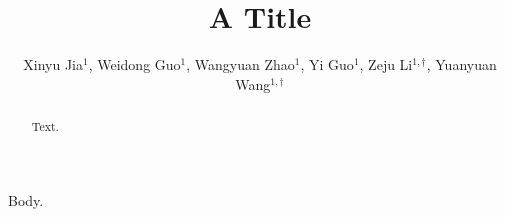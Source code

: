\documentclass{llncs}
\begin{document}
\title{A Title}
\author{Xinyu Jia$^{1}$, Weidong Guo$^{1}$, Wangyuan Zhao$^{1}$, Yi Guo$^{1}$, Zeju Li$^{1,\dagger}$, Yuanyuan Wang$^{1,\dagger}$}
\maketitle
\begin{abstract}Text.\end{abstract}
Body.
\end{document}
